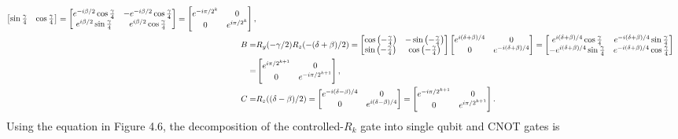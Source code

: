 \documentclass[en]{sol-man}
\begin{document}
\begin{sol}
\begin{align}
\begin{bmatrix}
            \sin\frac{\gamma}{4}&\cos\frac{\gamma}{4}
        \end{bmatrix}=\begin{bmatrix}
            e^{-i\beta/2}\cos\frac{\gamma}{4}&-e^{-i\beta/2}\cos\frac{\gamma}{4}\\
            e^{i\beta/2}\sin\frac{\gamma}{4}&e^{i\beta/2}\cos\frac{\gamma}{4}
        \end{bmatrix}=\begin{bmatrix}
            e^{-i\pi/2^k}&0\\
            0&e^{i\pi/2^k}
        \end{bmatrix},\\
        \notag B=&R_y(-\gamma/2)R_z(-(\delta+\beta)/2)=\begin{bmatrix}
            \cos\left(-\frac{\gamma}{4}\right)&-\sin\left(-\frac{\gamma}{4}\right)\\
            \sin\left(-\frac{\gamma}{4}\right)&\cos\left(-\frac{\gamma}{4}\right)
        \end{bmatrix}\begin{bmatrix}
            e^{i(\delta+\beta)/4}&0\\
            0&e^{-i(\delta+\beta)/4}
        \end{bmatrix}=\begin{bmatrix}
            e^{i(\delta+\beta)/4}\cos\frac{\gamma}{4}&e^{-i(\delta+\beta)/4}\sin\frac{\gamma}{4}\\
            -e^{i(\delta+\beta)/4}\sin\frac{\gamma}{4}&e^{-i(\delta+\beta)/4}\cos\frac{\gamma}{4}
        \end{bmatrix}\\
        =&\begin{bmatrix}
            e^{i\pi/2^{k+1}}&0\\
            0&e^{-i\pi/2^{k+1}}
        \end{bmatrix},\\
        C=&R_z((\delta-\beta)/2)=\begin{bmatrix}
            e^{-i(\delta-\beta)/4}&0\\
            0&e^{i(\delta-\beta)/4}
        \end{bmatrix}=\begin{bmatrix}
            e^{-i\pi/2^{k+1}}&0\\
            0&e^{i\pi/2^{k+1}}
        \end{bmatrix}.
    \end{align}
    Using the equation in Figure 4.6, the decomposition of the controlled-$R_k$ gate into single qubit and CNOT gates is

\end{sol}
\end{document}
